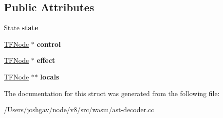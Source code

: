 \subsection*{Public Attributes}
\begin{DoxyCompactItemize}
\item 
State {\bfseries state}\hypertarget{structv8_1_1internal_1_1wasm_1_1_ssa_env_a802d4a522a8c9d79fd03758f556176c5}{}\label{structv8_1_1internal_1_1wasm_1_1_ssa_env_a802d4a522a8c9d79fd03758f556176c5}

\item 
\hyperlink{classv8_1_1internal_1_1compiler_1_1_node}{T\+F\+Node} $\ast$ {\bfseries control}\hypertarget{structv8_1_1internal_1_1wasm_1_1_ssa_env_ab9f26a0131d8a0f4d81804c50c26e719}{}\label{structv8_1_1internal_1_1wasm_1_1_ssa_env_ab9f26a0131d8a0f4d81804c50c26e719}

\item 
\hyperlink{classv8_1_1internal_1_1compiler_1_1_node}{T\+F\+Node} $\ast$ {\bfseries effect}\hypertarget{structv8_1_1internal_1_1wasm_1_1_ssa_env_a94c0e23051981da0f0c439d42009fe00}{}\label{structv8_1_1internal_1_1wasm_1_1_ssa_env_a94c0e23051981da0f0c439d42009fe00}

\item 
\hyperlink{classv8_1_1internal_1_1compiler_1_1_node}{T\+F\+Node} $\ast$$\ast$ {\bfseries locals}\hypertarget{structv8_1_1internal_1_1wasm_1_1_ssa_env_a8a5f922072a246fc76b7cb7b6fbd8979}{}\label{structv8_1_1internal_1_1wasm_1_1_ssa_env_a8a5f922072a246fc76b7cb7b6fbd8979}

\end{DoxyCompactItemize}


The documentation for this struct was generated from the following file\+:\begin{DoxyCompactItemize}
\item 
/\+Users/joshgav/node/v8/src/wasm/ast-\/decoder.\+cc\end{DoxyCompactItemize}
